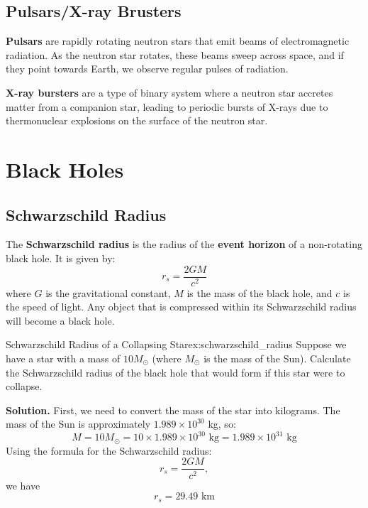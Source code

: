 \subsection{Pulsars/X-ray Brusters}
\begin{intuition}
\textbf{Pulsars} are rapidly rotating neutron stars that emit beams of electromagnetic radiation. As the neutron star rotates, these beams sweep across space, and if they point towards Earth, we observe regular pulses of radiation. 

\textbf{X-ray bursters} are a type of binary system where a neutron star accretes matter from a companion star, leading to periodic bursts of X-rays due to thermonuclear explosions on the surface of the neutron star.
\end{intuition}

\section{Black Holes}

\subsection{Schwarzschild Radius}
\begin{theory}
The \textbf{Schwarzschild radius} is the radius of the \textbf{event horizon} of a non-rotating black hole. It is given by:
\begin{equation}
r_s = \frac{2GM}{c^2}   
\end{equation}
where $G$ is the gravitational constant, $M$ is the mass of the black hole, and $c$ is the speed of light. Any object that is compressed within its Schwarzschild radius will become a black hole.  

\end{theory}

\begin{example}{Schwarzschild Radius of a Collapsing Star}{ex:schwarzschild_radius}
Suppose we have a star with a mass of $10 M_\odot$ (where $M_\odot$ is the mass of the Sun). Calculate the Schwarzschild radius of the black hole that would form if this star were to collapse.    

\smallskip\textbf{Solution.}
First, we need to convert the mass of the star into kilograms. The mass of the Sun is approximately $1.989 \times 10^{30}$ kg, so:
\begin{equation}
M = 10 M_\odot = 10 \times 1.989 \times 10^{30} \text{ kg} = 1.989 \times 10^{31} \text{ kg}
\end{equation}  
Using the formula for the Schwarzschild radius:
\begin{equation}
r_s = \frac{2GM}{c^2},
\end{equation}
we have
\begin{equation}
r_s = 29.49 \text{ km}
\end{equation}
\end{example}